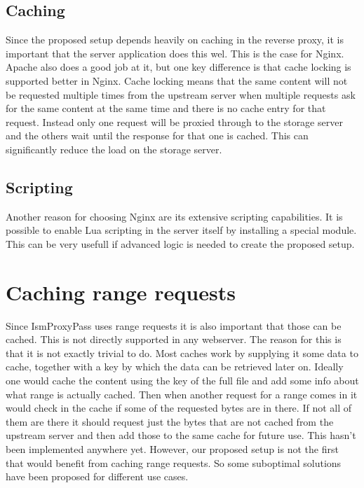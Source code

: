 \documentclass[twoside,openright]{uva-bachelor-thesis}
\begin{document}
\subsection{Caching}\label{sec:caching}
Since the proposed setup depends heavily on caching in the reverse proxy, it is
important that the server application does this wel. This is the case for Nginx.
Apache also does a good job at it, but one key difference is that cache locking is
supported better in Nginx. Cache locking means that the same content will not be
requested multiple times from the upstream server when multiple requests ask for
the same content at the same time and there is no cache entry for that
request. Instead only one request will be proxied through to the storage server
and the others wait until the response for that one is cached. This can
significantly reduce the load on the storage server.

\subsection{Scripting}
Another reason for choosing Nginx are its extensive scripting capabilities. It
is possible to enable Lua scripting in the server itself by installing a special
module\autocite{nginxlua}. This can be very usefull if advanced logic is needed
to create the proposed setup.


\section{Caching range requests}
Since IsmProxyPass uses range requests it is also important that those can be
cached. This is not directly supported in any webserver. The reason for
this is that it is not exactly trivial to do. Most caches work by supplying it
some data to cache, together with a key by which the data can be retrieved later
on.
Ideally one would cache the content using the key of the full file and add some
info about what range is actually cached. Then when another request for a range
comes in it would check in the cache if some of the requested bytes are in
there. If not all of them are there it should request just the bytes that are
not cached from the upstream server and then add those to the same cache for
future use. This hasn't been implemented anywhere yet. However, our proposed
setup is not the first that would benefit from caching range requests. So some
suboptimal solutions have been proposed for different use cases.
\end{document}
